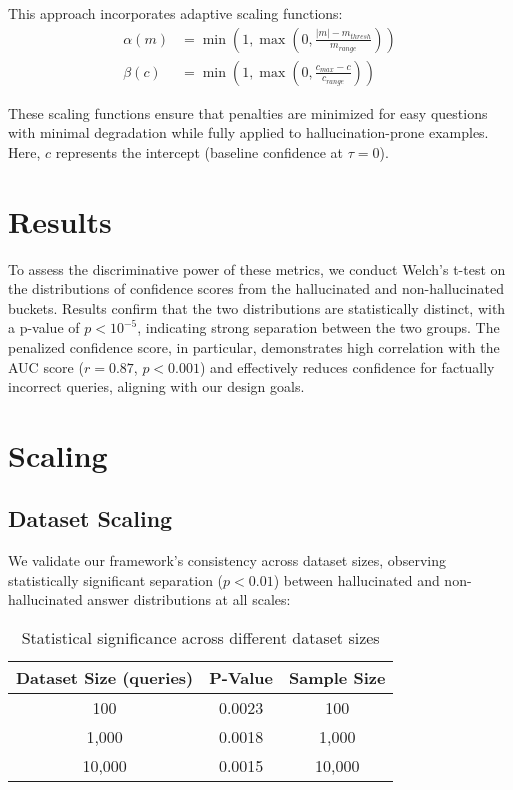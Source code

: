 \documentclass[sigconf]{acmart}
\begin{document}
\begin{enumerate}
    This approach incorporates adaptive scaling functions:
    \begin{align}
        \alpha(m) &= \min\left(1, \max\left(0, \frac{|m| - m_{thresh}}{m_{range}}\right)\right) \\
        \beta(c) &= \min\left(1, \max\left(0, \frac{c_{max} - c}{c_{range}}\right)\right)
    \end{align}
    
    These scaling functions ensure that penalties are minimized for easy questions with 
    minimal degradation while fully applied to hallucination-prone examples. Here, $c$ 
    represents the intercept (baseline confidence at $\tau=0$).
\end{enumerate}

\section{Results}

To assess the discriminative power of these metrics, we conduct Welch's t-test on the distributions of confidence scores from the hallucinated and non-hallucinated buckets. Results confirm that the two distributions are statistically distinct, with a p-value of $p < 10^{-5}$, indicating strong separation between the two groups. The penalized confidence score, in particular, demonstrates high correlation with the AUC score ($r = 0.87$, $p < 0.001$) and effectively reduces confidence for factually incorrect queries, aligning with our design goals.

\section{Scaling}

\subsection{Dataset Scaling}
We validate our framework's consistency across dataset sizes, observing statistically significant separation ($p < 0.01$) between hallucinated and non-hallucinated answer distributions at all scales:

\begin{table}[h]
\centering
\begin{tabular}{ccc}
\hline
\textbf{Dataset Size (queries)} & \textbf{P-Value} & \textbf{Sample Size} \\
\hline
100 & 0.0023 & 100 \\
1,000 & 0.0018 & 1,000 \\
10,000 & 0.0015 & 10,000 \\
\hline
\end{tabular}
\caption{Statistical significance across different dataset sizes}
\end{table}
\end{document}
